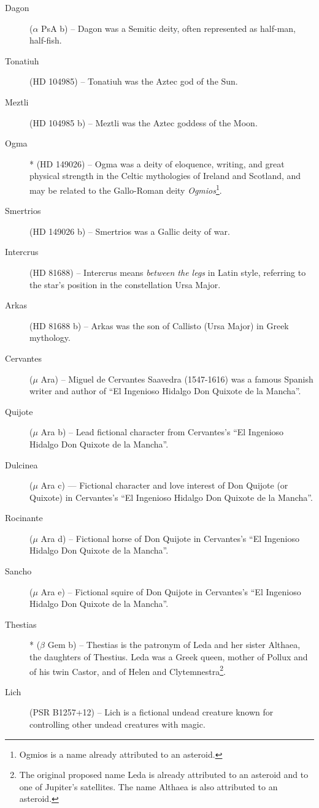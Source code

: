 \begin{description}
\item[Dagon] ($\alpha$ PsA b) -- Dagon was a Semitic deity, often represented as half-man, half-fish.
\item[Tonatiuh] (HD 104985) -- Tonatiuh was the Aztec god of the Sun.
\item[Meztli] (HD 104985 b) -- Meztli was the Aztec goddess of the Moon.
\item[Ogma]* (HD 149026) -- Ogma was a deity of eloquence, writing, and great physical strength in the Celtic mythologies of Ireland and Scotland, and may be related to the Gallo-Roman deity \textit{Ogmios}\footnote{Ogmios is a name already attributed to an asteroid.}.
\item[Smertrios] (HD 149026 b) -- Smertrios was a Gallic deity of war.
\item[Intercrus] (HD 81688) -- Intercrus means \textit{between the legs} in Latin style, referring to the star's position in the constellation Ursa Major.
\item[Arkas] (HD 81688 b) -- Arkas was the son of Callisto (Ursa Major) in Greek mythology.
\item[Cervantes] ($\mu$ Ara) -- Miguel de Cervantes Saavedra (1547-1616) was a famous Spanish writer and author of ``El Ingenioso Hidalgo Don Quixote de la Mancha''.
\item[Quijote] ($\mu$ Ara b) -- Lead fictional character from Cervantes's ``El Ingenioso Hidalgo Don Quixote de la Mancha''.
\item[Dulcinea]($\mu$ Ara c) — Fictional character and love interest of Don Quijote (or Quixote) in Cervantes's ``El Ingenioso Hidalgo Don Quixote de la Mancha''.
\item[Rocinante] ($\mu$ Ara d) -- Fictional horse of Don Quijote in Cervantes's ``El Ingenioso Hidalgo Don Quixote de la Mancha''.
\item[Sancho] ($\mu$ Ara e) -- Fictional squire of Don Quijote in Cervantes's ``El Ingenioso Hidalgo Don Quixote de la Mancha''.
\item[Thestias]* ($\beta$ Gem b) -- Thestias is the patronym of Leda and her sister Althaea, the daughters of Thestius. Leda was a Greek queen, mother of Pollux and of his twin Castor, and of Helen and Clytemnestra\footnote{The original proposed name Leda is already attributed to an asteroid and to one of Jupiter's satellites. The name Althaea is also attributed to an asteroid.}.
\item[Lich] (PSR B1257+12) -- Lich is a fictional undead creature known for controlling other undead creatures with magic.

\end{description}

